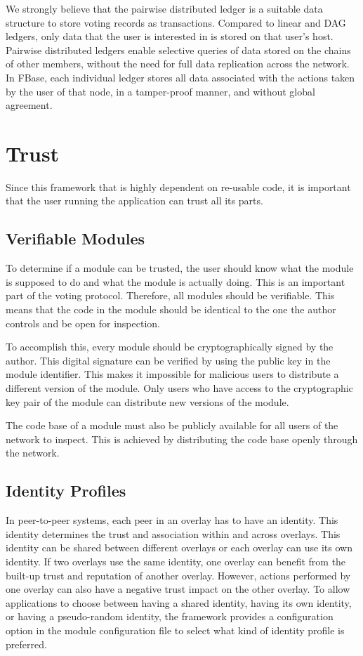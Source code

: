 We strongly believe that the pairwise distributed ledger is a suitable data structure to store voting records as transactions.
Compared to linear and DAG ledgers, only data that the user is interested in is stored on that user's host.
Pairwise distributed ledgers enable selective queries of data stored on the chains of other members, without the need for full data replication across the network.
In FBase, each individual ledger stores all data associated with the actions taken by the user of that node, in a tamper-proof manner, and without global agreement.

\section{Trust}

Since this framework that is highly dependent on re-usable code, it is important that the user running the application can trust all its parts.

\subsection{Verifiable Modules}

To determine if a module can be trusted, the user should know what the module is supposed to do and what the module is actually doing. This is an important part of the voting protocol. Therefore, all modules should be verifiable. This means that the code in the module should be identical to the one the author controls and be open for inspection.

To accomplish this, every module should be cryptographically signed by the author. This digital signature can be verified by using the public key in the module identifier. This makes it impossible for malicious users to distribute a different version of the module. Only users who have access to the cryptographic key pair of the module can distribute new versions of the module.

The code base of a module must also be publicly available for all users of the network to inspect. This is achieved by distributing the code base openly through the network.

\subsection{Identity Profiles}

In peer-to-peer systems, each peer in an overlay has to have an identity. This identity determines the trust and association within and across overlays. This identity can be shared between different overlays or each overlay can use its own identity. If two overlays use the same identity, one overlay can benefit from the built-up trust and reputation of another overlay. However, actions performed by one overlay can also have a negative trust impact on the other overlay. To allow applications to choose between having a shared identity, having its own identity, or having a pseudo-random identity,  the framework provides a configuration option in the module configuration file to select what kind of identity profile is preferred.

